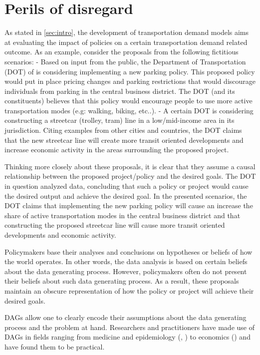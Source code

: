 \section{Perils of disregard}
\label{sec:graph-importance}

As stated in \ref{sec:intro}, the development of transportation demand models aims at evaluating the impact of policies on a certain
transportation demand related outcome. As an example, consider the proposals from the following fictitious scenarios: 
- Based on input from the public, the Department of Transportation (DOT) of  is considering implementing a new parking policy. 
This proposed policy would put in place pricing changes and parking restrictions that would discourage individuals from parking in the central business district. 
The DOT (and its constituents) believes that this policy would encourage people to use more active transportation modes (e.g: walking, biking, etc..).
- A certain DOT is considering constructing a streetcar (trolley, tram) line in a low/mid-income area in its jurisdiction.
Citing examples from other cities and countries, the DOT claims that the new streetcar line will create more transit oriented
developments and increase economic activity in the areas surrounding the proposed project. 


Thinking more closely about these proposals, it is clear that they assume a causal relationship between the proposed project/policy and the desired goals. 
The DOT in question analyzed data, concluding that such a policy or project would cause the desired output and achieve the desired goal.
In the presented scenarios, the DOT claims that implementing the new parking policy will cause an increase the share of 
active transportation modes in the central business district and that constructing the proposed streetcar line will 
cause more transit oriented developments and economic activity.

Policymakers base their analyses and conclusions on hypotheses or beliefs of how the world operates.
In other words, the data analysis is based on certain beliefs about the data generating process.
However, policymakers often do not present their beliefs about such data generating process.
As a result, these proposals maintain an obscure representation of how the policy or project will achieve their desired goals. 

DAGs allow one to clearly encode their assumptions about the data generating process and the problem at hand.
Researchers and practitioners have made use of DAGs in fields ranging from medicine and epidemiology (\citet{shrier_platt_2008}, \citet{sung_2011}) to economics (\citet{white2011causal}) and have found them to be practical.

